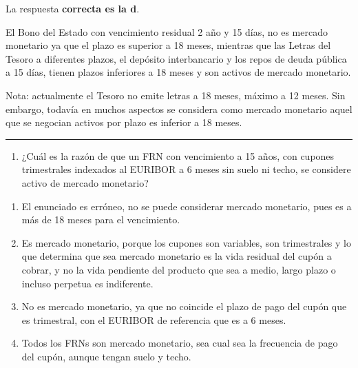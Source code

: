 \documentclass[
  letterpaper,
  DIV=11,
  numbers=noendperiod]{scrreprt}
\providecommand{\tightlist}{%
  \setlength{\itemsep}{0pt}\setlength{\parskip}{0pt}}\usepackage{longtable,booktabs,array}
\begin{document}
\begin{tcolorbox}[enhanced jigsaw, left=2mm, opacityback=0, colback=white, breakable, arc=.35mm, bottomrule=.15mm, rightrule=.15mm, toprule=.15mm, leftrule=.75mm, colframe=quarto-callout-tip-color-frame]
\begin{minipage}[t]{5.5mm}
\textcolor{quarto-callout-tip-color}{\faLightbulb}
\end{minipage}%
\begin{minipage}[t]{\textwidth - 5.5mm}

La respuesta \textbf{correcta es la d}.

El Bono del Estado con vencimiento residual 2 año y 15 días, no es
mercado monetario ya que el plazo es superior a 18 meses, mientras que
las Letras del Tesoro a diferentes plazos, el depósito interbancario y
los repos de deuda pública a 15 días, tienen plazos inferiores a 18
meses y son activos de mercado monetario.

Nota: actualmente el Tesoro no emite letras a 18 meses, máximo a 12
meses. Sin embargo, todavía en muchos aspectos se considera como mercado
monetario aquel que se negocian activos por plazo es inferior a 18
meses.

\end{minipage}%
\end{tcolorbox}

\begin{center}\rule{0.5\linewidth}{0.5pt}\end{center}

\begin{enumerate}
\def\labelenumi{\arabic{enumi}.}
\setcounter{enumi}{32}
\tightlist
\item
  ¿Cuál es la razón de que un FRN con vencimiento a 15 años, con cupones
  trimestrales indexados al EURIBOR a 6 meses sin suelo ni techo, se
  considere activo de mercado monetario?
\end{enumerate}

\begin{enumerate}
\def\labelenumi{\alph{enumi})}
\item
  El enunciado es erróneo, no se puede considerar mercado monetario,
  pues es a más de 18 meses para el vencimiento.
\item
  Es mercado monetario, porque los cupones son variables, son
  trimestrales y lo que determina que sea mercado monetario es la vida
  residual del cupón a cobrar, y no la vida pendiente del producto que
  sea a medio, largo plazo o incluso perpetua es indiferente.
\item
  No es mercado monetario, ya que no coincide el plazo de pago del cupón
  que es trimestral, con el EURIBOR de referencia que es a 6 meses.
\item
  Todos los FRNs son mercado monetario, sea cual sea la frecuencia de
  pago del cupón, aunque tengan suelo y techo.
\end{enumerate}
\end{document}
